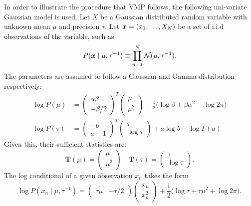 In order to illustrate the procedure that VMP follows, the following uni-variate Gaussian model is used. Let \(X\) be a Gaussian distributed random variable with unknown mean \(\mu\) and precision \(\tau\). Let \(\bm{x} = (x_{1},\dots,X_{N})\) be a set of i.i.d observations of the variable, such as
\[
  P(\bm{x} \mid \mu, \tau^{-1}) \equiv \prod_{n=1}^{N}\mathcal{N}(\mu, \tau^{-1}).
\]
The parameters are assumed to follow a Gaussian and Gamma distribution respectively:
\[
  \begin{aligned}
    \log P(\mu) &= \begin{pmatrix} \alpha \beta \\ -\beta/2 \end{pmatrix}^{T}\begin{pmatrix} \mu \\ \mu^{2} \end{pmatrix} + \frac{1}{2}\big( \log \beta + \beta \alpha^{2} - \log 2\pi \big)\\
    \log P(\tau) &= \begin{pmatrix} -b \\ a - 1 \end{pmatrix}^{T}\begin{pmatrix} \tau \\ \log \tau \end{pmatrix} + a \log b - \log \Gamma (a)
  \end{aligned}
\]
Given this, their sufficient statistics are:
\[
  \bm{T}(\mu) = \begin{pmatrix} \mu \\ \mu^{2} \end{pmatrix} \quad \bm{T}(\tau) = \begin{pmatrix} \tau \\ \log \tau \end{pmatrix}.
\]
The log conditional of a given observation \(x_{n}\) takes the form
\[
  \log P(x_{n} \mid \mu, \tau^{-1}) = \begin{pmatrix} \tau \mu & - \tau/2 \end{pmatrix} \begin{pmatrix} x_{n} \\ x_{n}^{2} \end{pmatrix} + \frac{1}{2}\big( \log \tau + \tau \mu^{2} + \log 2\pi \big).
\]

